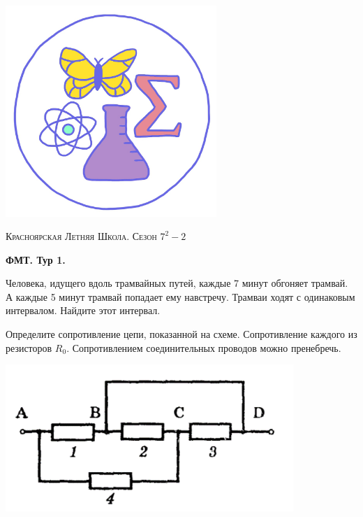 \colorbox{white!10!}{
    \begin{minipage}{0.2\textwidth}
       \begin{flushleft}
        \includegraphics[width = 0.6\textwidth]{Эмблема.png}
       \end{flushleft}
    \end{minipage}
    \begin{minipage}[t]{0.7 \textwidth}
        \begin{center}
            {\huge \textsc{Красноярская Летняя Школа. Сезон $7^2 - 2$}}
            \vspace{0.25cm}
            
            { \huge \textbf{ФМТ. Тур 1.}}
        \end{center}
        \vspace{0.05cm}
    \end{minipage}
}

\begin{enumerate}
    \item Человека, идущего вдоль трамвайных путей, каждые 7 минут обгоняет трамвай. А каждые 5 минут трамвай попадает ему навстречу. Трамваи ходят с одинаковым интервалом. Найдите этот интервал.
    \\
    
    \parbox[b]{.7\textwidth}{%
    \item 
        Определите сопротивление цепи, показанной на схеме. Сопротивление каждого из резисторов $R_0$. Сопротивлением соединительных проводов можно пренебречь. 
    }\hfill\includegraphics[width=.25\textwidth]{pictures/Tur_1.2.png}
\end{enumerate}
   